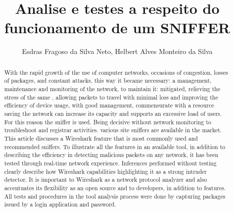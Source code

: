 \documentclass[12pt]{article}
\title{Analise e testes a respeito do funcionamento de um SNIFFER }
\author{Esdras Fragoso da Silva Neto, Helbert Alves Monteiro da Silva }
\begin{document}
 

\maketitle

\begin{abstract}
  With the rapid growth of the use of computer networks, occasions of congestion, losses of packages, and constant attacks, this way it became necessary: a management, maintenance and monitoring of the network, to maintain it: mitigated, relieving the stress of the same , allowing packets to travel with minimal loss and improving the efficiency of device usage, with good management, commensurate with a resource saving the network can increase its capacity and supports an excessive load of users. For this reason the sniffer is used. Being decisive without network monitoring to troubleshoot and registrar
activities. various site sniffers are available in the market. This article discusses a Wireshark feature that is most commonly used and recommended sniffers. To illustrate all the features in an available tool, in addition to describing the efficiency in detecting malicious packets on any network, it has been tested through real-time network experience. Inferences performed without testing clearly describe how Wireshark capabilities
highlighting it as a strong intruder detector. It is important to
Wireshark as a network protocol analyzer and also
accentuates its flexibility as an open source and
to developers, in addition to features. All tests and procedures in the tool analysis process were done by capturing packages issued by a login application and password.
  
\end{abstract}
     
\end{document}
